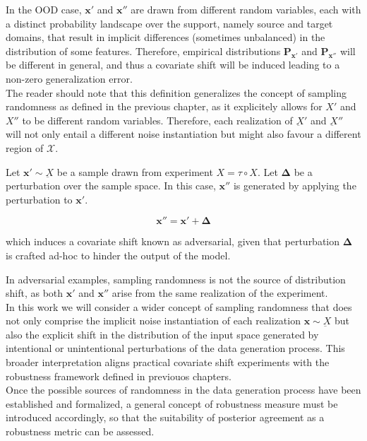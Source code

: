 In the OOD case, $\bm{x}'$ and $\bm{x}''$ are
drawn from different random variables, each with a distinct probability 
landscape over the support, namely source and target domains, that result 
in implicit differences (sometimes unbalanced) in the distribution of some features.
Therefore, empirical distributions $\mathbf{P}_{\bm{x}'}$ and $\mathbf{P}_{\bm{x}''}$ will
be different in general, and thus a covariate shift will be induced
leading to a non-zero generalization error. \\

The reader should note that this definition generalizes the
concept of sampling randomness as defined in the previous 
chapter, as it explicitely allows for $X'$ and $X''$ to be 
different random variables. Therefore, each realization of 
$\underbar{X}'$ and $\underbar{X}''$ will not only entail a 
different noise instantiation but might 
also favour a different region of $\mathcal{X}$.

\begin{definition}
    Let $\bm{x}' \sim \underbar{X}$ be a sample drawn from experiment
    $X = \tau \circ X$. Let $\bm{\Delta}$ be a perturbation over
    the sample space. In this case, $\bm{x}''$ is generated by applying
    the perturbation to $\bm{x}'$.

    $$
    \bm{x}'' = \bm{x}' + \bm{\Delta}
    $$

    which induces a covariate shift known as adversarial, given that
    perturbation $\bm{\Delta}$ is crafted ad-hoc to hinder the 
    output of the model.
\end{definition}

In adversarial examples, sampling randomness is not the source of
distribution shift, as both $\bm{x}'$ and $\bm{x}''$ arise from
the same realization of the experiment. \\

In this work we will consider a wider concept of sampling 
randomness that does not only comprise the implicit
noise instantiation of each realization $\bm{x} \sim \underbar{X}$
but also the explicit shift in the distribution of the input space
generated by intentional or unintentional perturbations of the 
data generation process. This broader interpretation aligns practical
covariate shift experiments with the robustness framework
defined in previouos chapters.\\

Once the possible sources of randomness in the data 
generation process have been established and formalized, 
a general concept of robustness measure must be introduced 
accordingly, so that the suitability of posterior agreement
as a robustness metric can be assessed.

